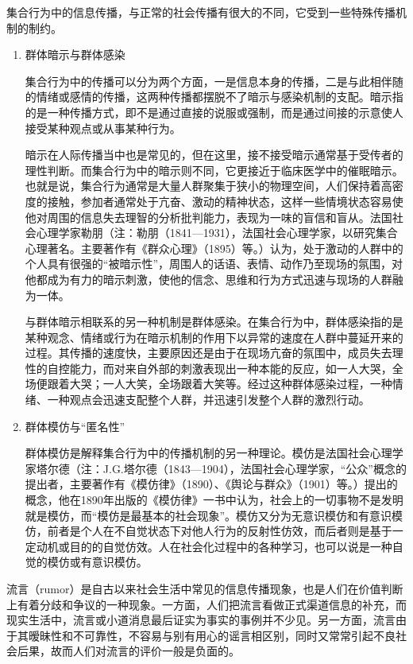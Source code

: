 \documentclass[UTF8,12pt]{ctexart}
\numberwithin{equation}{section} %
\numberwithin{figure}{section}
\numberwithin{table}{section}
\begin{document}
	
	集合行为中的信息传播，与正常的社会传播有很大的不同，它受到一些特殊传播机制的制约。
	\begin{enumerate}
		\item 群体暗示与群体感染
		
		集合行为中的传播可以分为两个方面，一是信息本身的传播，二是与此相伴随的情绪或感情的传播，这两种传播都摆脱不了暗示与感染机制的支配。暗示指的是一种传播方式，即不是通过直接的说服或强制，而是通过间接的示意使人接受某种观点或从事某种行为。
		
		暗示在人际传播当中也是常见的，但在这里，接不接受暗示通常基于受传者的理性判断。而集合行为中的暗示则不同，它更接近于临床医学中的催眠暗示。也就是说，集合行为通常是大量人群聚集于狭小的物理空间，人们保持着高密度的接触，参加者通常处于亢奋、激动的精神状态，这样一些情境状态容易使他对周围的信息失去理智的分析批判能力，表现为一味的盲信和盲从。法国社会心理学家勒朋（注：勒朋（1841—1931），法国社会心理学家，以研究集合心理著名。主要著作有《群众心理》（1895）等。）认为，处于激动的人群中的个人具有很强的“被暗示性”，周围人的话语、表情、动作乃至现场的氛围，对他都成为有力的暗示刺激，使他的信念、思维和行为方式迅速与现场的人群融为一体。
		
		与群体暗示相联系的另一种机制是群体感染。在集合行为中，群体感染指的是某种观念、情绪或行为在暗示机制的作用下以异常的速度在人群中蔓延开来的过程。其传播的速度快，主要原因还是由于在现场亢奋的氛围中，成员失去理性的自控能力，而对来自外部的刺激表现出一种本能的反应，如一人大哭，全场便跟着大哭；一人大笑，全场跟着大笑等。经过这种群体感染过程，一种情绪、一种观点会迅速支配整个人群，并迅速引发整个人群的激烈行动。
		
		\item 群体模仿与“匿名性”
		
		群体模仿是解释集合行为中的传播机制的另一种理论。模仿是法国社会心理学家塔尔德（注：J.G.塔尔德（1843—1904），法国社会心理学家，“公众”概念的提出者，主要著作有《模仿律》（1890）、《舆论与群众》（1901）等。）提出的概念，他在1890年出版的《模仿律》一书中认为，社会上的一切事物不是发明就是模仿，而“模仿是最基本的社会现象”。模仿又分为无意识模仿和有意识模仿，前者是个人在不自觉状态下对他人行为的反射性仿效，而后者则是基于一定动机或目的的自觉仿效。人在社会化过程中的各种学习，也可以说是一种自觉的模仿或有意识模仿。
		
	\end{enumerate}
	
	流言（rumor）是自古以来社会生活中常见的信息传播现象，也是人们在价值判断上有着分歧和争议的一种现象。一方面，人们把流言看做正式渠道信息的补充，而现实生活中，流言或小道消息最后证实为事实的事例并不少见。另一方面，流言由于其暧昧性和不可靠性，不容易与别有用心的谣言相区别，同时又常常引起不良社会后果，故而人们对流言的评价一般是负面的。
	
\end{document}
